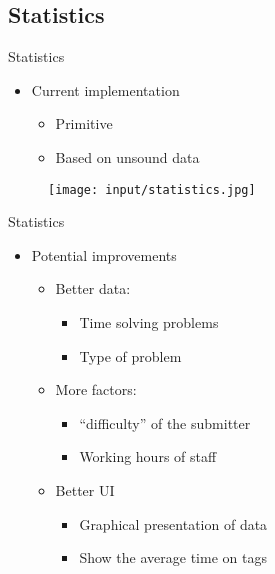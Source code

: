 \subsection{Statistics}
\begin{frame}{Statistics}

\begin{itemize}
\item <1-> Current implementation
	\begin{itemize}
	\item<2-> Primitive
	\item<3-> Based on unsound data
	\end{itemize}
\end{itemize}

\begin{figure}[htbp]
	\begin{center}
	\texttt{[image: input/statistics.jpg]}
	\end{center}
\end{figure}

\end{frame}

\begin{frame}{Statistics}

\begin{itemize}
\item<1-> Potential improvements
	\begin{itemize}
	\item<2-> Better data:
		\begin{itemize}
		\item<3-> Time solving problems
		\item<4-> Type of problem
		\end{itemize}
	\item<5-> More factors:
		\begin{itemize}
		\item<6-> ``difficulty'' of the submitter
		\item<7-> Working hours of staff
		\end{itemize}
	\item<8-> Better UI
		\begin{itemize}
		\item<9-> Graphical presentation of data
		\item<10-> Show the average time on tags
		\end{itemize}
	\end{itemize}
\end{itemize}

\end{frame}